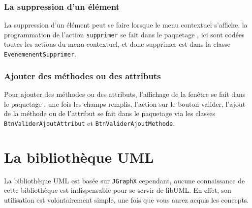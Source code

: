 \documentclass[12pt,a4paper,oneside]{book}
\begin{document}
	\subsection{La suppression d'un élément}
	La suppression d'un élément peut se faire lorsque le menu contextuel s'affiche, la programmation de l'action \texttt{supprimer} se fait dans le paquetage
	, ici sont codées toutes les actions du menu contextuel, et donc supprimer est dans la classe \texttt{EvenemenentSupprimer}.
	\subsection{Ajouter des méthodes ou des attributs}
	Pour ajouter des méthodes ou des attributs, l'affichage de la fenêtre se fait dans le paquetage , une fois les champs remplis, l'action
	sur le bouton valider, l'ajout de la méthode ou de l'attribut se fait dans le paquetage  via les classes \texttt{BtnValiderAjoutAttribut} 
	et \texttt{BtnValiderAjoutMethode}.
	
	\chapter{La bibliothèque UML}	
	\nouveauChapitre
	La bibliothèque UML est basée sur \texttt{JGraphX} cependant, aucune connaissance de cette bibliothèque est indispensable pour se servir de libUML. En effet, son 
	utilisation est volontairement simple, une fois que vous aurez acquis les concepts.
\end{document}
